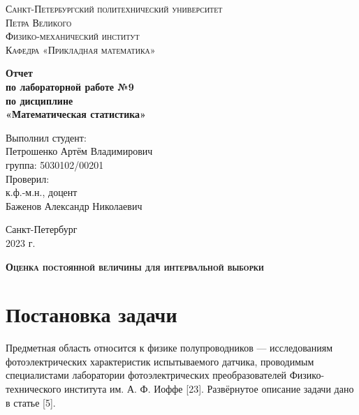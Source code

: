 \documentclass[12pt]{article}
\begin{document}
	\begin{titlepage}
		\begin{center}
			\textsc{Санкт-Петербургский политехнический университет\\Петра Великого\\[5mm]
				Физико-механический институт\\[2mm]
				Кафедра «Прикладная математика»}
			
			\vfill
			
			\textbf{Отчет\\по лабораторной работе №9\\по дисциплине\\«Математическая статистика»
				\\[26mm]
			}
		\end{center}
		
		\noindent
		\hspace*{100mm} Выполнил студент:\\[3mm]
		\hspace*{100mm} Петрошенко Артём Владимирович\\
		\hspace*{100mm} группа: 5030102/00201\\[10mm]
		\hspace*{100mm} Проверил:\\[3mm]
		\hspace*{100mm} к.ф.-м.н., доцент\\
		\hspace*{100mm} Баженов Александр Николаевич
		
		\vspace*{\fill}
		\begin{center}
			Санкт-Петербург\\2023 г.
		\end{center}
	\end{titlepage}
	
	\newpage
	\tableofcontents
	\newpage
	\listoffigures
	\newpage
	\listoftables
	\newpage
	
	\textsc{\textbf{\large{Оценка постоянной величины для интервальной выборки}}}\\
	\section{Постановка задачи}
	Предметная область относится к физике полупроводников — исследованиям фотоэлектрических характеристик испытываемого датчика, проводимым специалистами лаборатории фотоэлектрических преобразователей Физико-технического института им. А. Ф. Иоффе [23].
	Развёрнутое описание задачи дано в статье [5].
	
\end{document}
